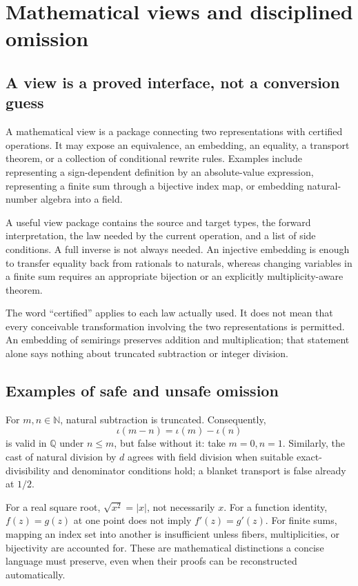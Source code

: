 \documentclass[11pt,a4paper]{article}
\newcommand{\N}{\mathbb N}
\newcommand{\Q}{\mathbb Q}
\theoremstyle{remark}
\begin{document}
\section{Mathematical views and disciplined omission}\label{sec:views}

\subsection{A view is a proved interface, not a conversion guess}

A mathematical view is a package connecting two representations with certified operations. It may expose an equivalence, an embedding, an equality, a transport theorem, or a collection of conditional rewrite rules. Examples include representing a sign-dependent definition by an absolute-value expression, representing a finite sum through a bijective index map, or embedding natural-number algebra into a field.

A useful view package contains the source and target types, the forward interpretation, the law needed by the current operation, and a list of side conditions. A full inverse is not always needed. An injective embedding is enough to transfer equality back from rationals to naturals, whereas changing variables in a finite sum requires an appropriate bijection or an explicitly multiplicity-aware theorem.

The word ``certified'' applies to each law actually used. It does not mean that every conceivable transformation involving the two representations is permitted. An embedding of semirings preserves addition and multiplication; that statement alone says nothing about truncated subtraction or integer division.

\subsection{Examples of safe and unsafe omission}

For \(m,n\in\N\), natural subtraction is truncated. Consequently,
\[
 \iota(m-n)=\iota(m)-\iota(n)
\]
is valid in \(\Q\) under \(n\le m\), but false without it: take \(m=0,n=1\). Similarly, the cast of natural division by \(d\) agrees with field division when suitable exact-divisibility and denominator conditions hold; a blanket transport is false already at \(1/2\).

For a real square root, \(\sqrt{x^2}=|x|\), not necessarily \(x\). For a function identity, \(f(z)=g(z)\) at one point does not imply \(f'(z)=g'(z)\). For finite sums, mapping an index set into another is insufficient unless fibers, multiplicities, or bijectivity are accounted for. These are mathematical distinctions a concise language must preserve, even when their proofs can be reconstructed automatically.
\end{document}

